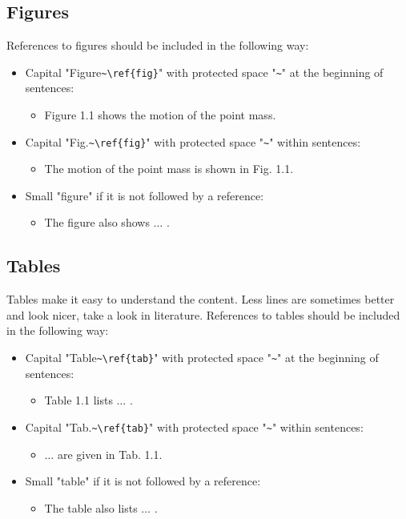 \subsection{Figures}

References to figures should be included in the following way:
\begin{itemize}
	\item Capital "Figure\verb|~\ref{fig}|" with protected space "\verb|~|" at the beginning of sentences:
	\begin{itemize}
		\item Figure 1.1 shows the motion of the point mass.
	\end{itemize}
	\item Capital "Fig.\verb|~\ref{fig}|" with protected space "\verb|~|" within sentences:
	\begin{itemize}
		\item The motion of the point mass is shown in Fig. 1.1.
	\end{itemize}
	\item Small "figure" if it is not followed by a reference:
	\begin{itemize}
		\item The figure also shows $\ldots$ .
	\end{itemize}
\end{itemize}

\subsection{Tables}

Tables make it easy to understand the content. Less lines are sometimes better and look nicer, take a look in literature.
References to tables should be included in the following way:
\begin{itemize}
	\item Capital "Table\verb|~\ref{tab}|" with protected space "\verb|~|"  at the beginning of sentences:
	\begin{itemize}
		\item Table 1.1 lists $\ldots$ .
	\end{itemize}
	\item Capital "Tab.\verb|~\ref{tab}|" with protected space "\verb|~|"  within sentences:
	\begin{itemize}
		\item $\ldots$ are given in Tab. 1.1.
	\end{itemize}
	\item Small "table" if it is not followed by a reference:
	\begin{itemize}
		\item The table also lists $\ldots$ .
	\end{itemize}
\end{itemize}	

